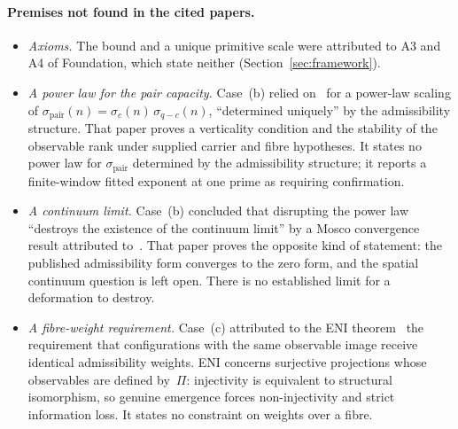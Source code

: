 \documentclass[11pt,a4paper]{article}
\begin{document}
    \paragraph{Premises not found in the cited papers.}
    \begin{itemize}
      \item \emph{Axioms.}
        The bound and a unique primitive scale were attributed to A3 and A4 of Foundation, which state neither
        (Section~\ref{sec:framework}).
      \item \emph{A power law for the pair capacity.}
        Case~(b) relied on~\cite{Beau2026a28} for a power-law scaling of
        $\sigma_{\mathrm{pair}}(n)=\sigma_c(n)\,\sigma_{q-c}(n)$, ``determined uniquely'' by the admissibility
        structure.
        That paper proves a verticality condition and the stability of the observable rank under supplied
        carrier and fibre hypotheses.
        It states no power law for $\sigma_{\mathrm{pair}}$ determined by the admissibility structure; it
        reports a finite-window fitted exponent at one prime as requiring confirmation.
      \item \emph{A continuum limit.}
        Case~(b) concluded that disrupting the power law ``destroys the existence of the continuum limit'' by a
        Mosco convergence result attributed to~\cite{Beau2026q5a}.
        That paper proves the opposite kind of statement: the published admissibility form converges to the zero
        form, and the spatial continuum question is left open.
        There is no established limit for a deformation to destroy.
      \item \emph{A fibre-weight requirement.}
        Case~(c) attributed to the ENI theorem~\cite{Beau2026l} the requirement that configurations with the
        same observable image receive identical admissibility weights.
        ENI concerns surjective projections whose observables are defined by~$\Pi$: injectivity is equivalent
        to structural isomorphism, so genuine emergence forces non-injectivity and strict information loss.
        It states no constraint on weights over a fibre.
    \end{itemize}
\end{document}
